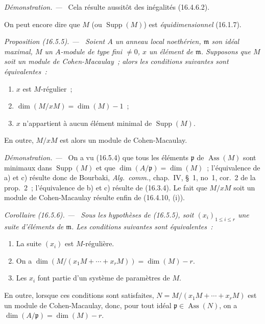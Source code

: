 \documentclass[10pt,oneside]{book}
\makeatletter
\newcommand{\setmanualcurrentlabel}[1]{\def\@currentlabel{#1}}
\newcommand{\oldpage}[2][]{%
  \setcounter{footnote}{0}%
  \marginpar{\scriptsize\textbf{#1}~|~#2}\ignorespaces}
\newenvironment{proposition}[1][]{%
  \setmanualcurrentlabel{#1}\par\medskip\noindent\itshape Proposition (#1). ---\ }{\par}
\newenvironment{corollary}[1][]{%
  \setmanualcurrentlabel{#1}\par\medskip\noindent\itshape Corollaire (#1). ---\ }{\par}
\newenvironment{proof}{%
  \par\medskip\noindent\textit{Démonstration. ---\ }}{\par}
\makeatother
\begin{document}
\begin{proof}
Cela résulte aussitôt des inégalités (16.4.6.2).
\end{proof}

On peut encore dire que $M$ (ou $\operatorname{Supp}(M)$) est
\emph{équidimensionnel} (16.1.7).

\oldpage[0\textsubscript{IV-1}]{37}

\begin{proposition}[16.5.5]
\label{0.16.5.5-fr}
Soient $A$ un anneau local noethérien, $\mathfrak{m}$ son idéal maximal, $M$
un $A$-module de type fini $\neq0$, $x$ un élément de $\mathfrak{m}$.
Supposons que $M$ soit un module de Cohen-Macaulay~; alors les conditions
suivantes sont équivalentes~:
\begin{enumerate}
  \item[a)] $x$ est $M$-régulier~;
  \item[b)] $\dim(M/xM)=\dim(M)-1$~;
  \item[c)] $x$ n'appartient à aucun élément minimal de
  $\operatorname{Supp}(M)$.
\end{enumerate}
En outre, $M/xM$ est alors un module de Cohen-Macaulay.
\end{proposition}

\begin{proof}
On a vu (16.5.4) que tous les éléments $\mathfrak{p}$ de
$\operatorname{Ass}(M)$ sont minimaux dans $\operatorname{Supp}(M)$ et que
$\dim(A/\mathfrak{p})=\dim(M)$~; l'équivalence de a) et c) résulte donc de
Bourbaki, \emph{Alg.~comm.}, chap.~IV, \S~1, no~1, cor.~2 de la prop.~2~;
l'équivalence de b) et c) résulte de (16.3.4). Le fait que $M/xM$ soit un
module de Cohen-Macaulay résulte enfin de (16.4.10, (i)).
\end{proof}

\begin{corollary}[16.5.6]
\label{0.16.5.6-fr}
Sous les hypothèses de (16.5.5), soit $(x_i)_{1\leq i\leq r}$ une suite
d'éléments de $\mathfrak{m}$. Les conditions suivantes sont équivalentes~:
\begin{enumerate}
  \item[a)] La suite $(x_i)$ est $M$-régulière.
  \item[b)] On a
  $\dim(M/(x_1M+\cdots+x_rM))=\dim(M)-r$.
  \item[c)] Les $x_i$ font partie d'un système de paramètres de $M$.
\end{enumerate}
En outre, lorsque ces conditions sont satisfaites,
$N=M/(x_1M+\cdots+x_rM)$ est un module de Cohen-Macaulay, donc, pour tout
idéal $\mathfrak{p}\in\operatorname{Ass}(N)$, on a
$\dim(A/\mathfrak{p})=\dim(M)-r$.
\end{corollary}
\end{document}
